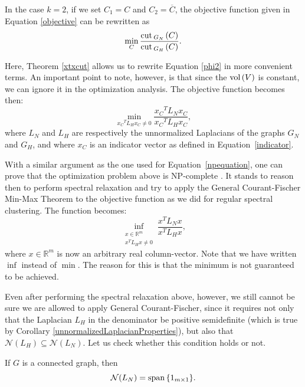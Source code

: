 In the case $k=2$, if we set $C_1 = C$ and $C_2 = \overline C$, the objective function given in Equation \vref{objective} can be rewritten as 
\begin{equation}\label{phi2}
   \min_C \frac{\operatorname{cut\,}_{G_N\,}(C)}{\operatorname{cut\,}_{G_H\,}(C)}.
\end{equation}

Here, Theorem \vref{xtxcut} allows us to rewrite Equation \vref{phi2} in more convenient terms. 
An important point to note, however, is that since the $\operatorname*{vol\,} (V)$ is constant, we can ignore it in the optimization analysis.
The objective function becomes then:
\begin{equation}
   \min_{{x_C}^TL_H {x_C} \ne 0} \frac{{x_C}^TL_N{x_C}}{{x_C}^TL_H{x_C}},
\end{equation}
where $L_N$ and $L_H$ are respectively the unnormalized Laplacians of the graphs $G_N$ and $G_H$, and where $x_C$ is an indicator vector as defined in Equation~\vref{indicator}.

With a similar argument as the one used for Equation~\vref{npequation}, one can prove that the optimization problem above is NP-complete \cite{fastge2}.
It stands to reason then to perform spectral relaxation and try to apply the General Courant-Fischer Min-Max Theorem to the objective function as we did for regular spectral clustering. The function becomes:
\begin{equation}\label{inf}
   \inf_{\substack{x \in \mathbb R^m \\ x^T L_H x \ne 0}} \frac{x^T L_N x}{x^T L_H x},
\end{equation}
where $x \in \mathbb R^{m }$ is now an arbitrary real column-vector.
Note that we have written $\inf$ instead of $\min$.
The reason for this is that the minimum is not guaranteed to be achieved.

Even after performing the spectral relaxation above, however, we still cannot be sure we are allowed to apply General Courant-Fischer, since it requires not only that the Laplacian $L_H$ in the denominator be positive semidefinite (which is true by Corollary \vref{unnormalizedLaplacianProperties}), but also that $\mathcal N (L_H) \subseteq \mathcal N (L_N)$. 
Let us check whether this condition holds or not.


\begin{proposition} \label{spanOfLn}
   If $G$ is a connected graph, then 
   \begin{equation}
      \mathcal N (L_N) = \operatorname{span\,} \{ 1_{m \times 1} \}.
   \end{equation}
\end{proposition}

